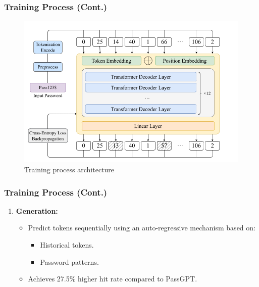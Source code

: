 \documentclass[
	12pt, %
]{beamer}
\begin{document}
\begin{frame}
	\frametitle{Training Process (Cont.)}
	
	\begin{figure}
		\centering
		\includegraphics[width=0.8\linewidth]{Images/img2}
		\caption{Training process architecture}
		\label{fig:Training process architecture}
	\end{figure}
\end{frame}














\begin{frame}
	\frametitle{Training Process (Cont.)}
	\begin{enumerate}
	\item \textbf{Generation:}
	\begin{itemize}
		\item Predict tokens sequentially using an auto-regressive mechanism based on:
		\begin{itemize}
			\item Historical tokens.
			\item Password patterns.
		\end{itemize}
		\item Achieves 27.5\% higher hit rate compared to PassGPT.
	\end{itemize}
\end{enumerate}
\end{frame}
\end{document}
